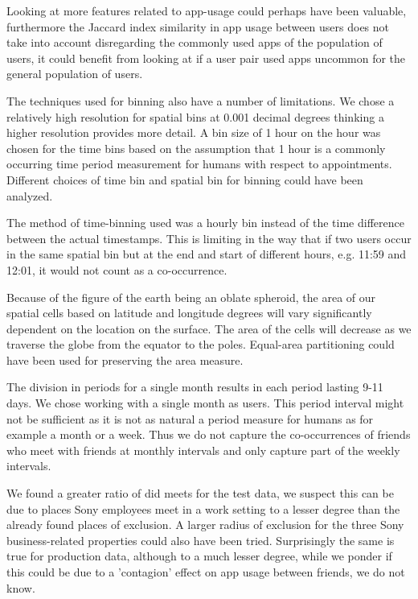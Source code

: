 Looking at more features related to app-usage could perhaps have been valuable, furthermore the Jaccard index similarity in app usage between users does not take into account disregarding the commonly used apps of the population of users, it could benefit from looking at if a user pair used apps uncommon for the general population of users.

The techniques used for binning also have a number of limitations.
We chose a relatively high resolution for spatial bins at 0.001 decimal degrees thinking a higher resolution provides more detail. A bin size of 1 hour on the hour was chosen for the time bins based on the assumption that 1 hour is a commonly occurring time period measurement for humans with respect to appointments. Different choices of time bin and spatial bin for binning could have been analyzed.

The method of time-binning used was a hourly bin instead of the time difference between the actual timestamps. This is limiting in the way that if two users occur in the same spatial bin but at the end and start of different hours, e.g. 11:59 and 12:01, it would not count as a co-occurrence.

Because of the figure of the earth being an oblate spheroid, the area of our spatial cells based on latitude and longitude degrees will vary significantly dependent on the location on the surface. The area of the cells will decrease as we traverse the globe from the equator to the poles. Equal-area partitioning could have been used for preserving the area measure.

The division in periods for a single month results in each period lasting 9-11 days. We chose working with a single month as users. This period interval might not be sufficient as it is not as natural a period measure for humans as for example a month or a week. Thus we do not capture the co-occurrences of friends who meet with friends at monthly intervals and only capture part of the weekly intervals.

We found a greater ratio of did meets for the test data, we suspect this can be due to places Sony employees meet in a work setting to a lesser degree than the already found places of exclusion. A larger radius of exclusion for the three Sony business-related properties could also have been tried.
Surprisingly the same is true for production data, although to a much lesser degree, while we ponder if this could be due to a 'contagion' effect on app usage between friends, we do not know.

